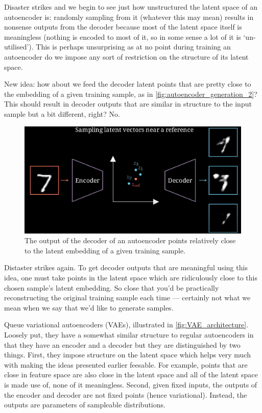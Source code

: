 \documentclass[11pt]{article}
\begin{document}
Disaster strikes and we begin to see just how unstructured the latent space of an autoencoder is: randomly sampling from it (whatever this may mean) results in nonsense outputs from the decoder because most of the latent space itself is meaningless (nothing is encoded to most of it, so in some sense a lot of it is `un-utilised'). This is perhaps unsurprising as at no point during training an autoencoder do we impose any sort of restriction on the structure of its latent space.

New idea: how about we feed the decoder latent points that are pretty close to the embedding of a given training sample, as in \autoref{fig:autoencoder_generation_2}? This should result in decoder outputs that are similar in structure to the input sample but a bit different, right? No.

\begin{figure}[ht]
    \centering
    \includegraphics[width=0.75\columnwidth]{./figures/generative_models/AEs_gen_2.png}
    \caption{\centering The output of the decoder of an autoencoder points relatively close to the latent embedding of a given training sample.}
    \label{fig:autoencoder_generation_2}
\end{figure}

Distaster strikes again. To get decoder outputs that are meaningful using this idea, one must take points in the latent space which are ridiculously close to this chosen sample's latent embedding. So close that you'd be practically reconstructing the original training sample each time — certainly not what we mean when we say that we'd like to generate samples.

Queue variational autoencoders (VAEs), illustrated in \autoref{fig:VAE_architecture}. Loosely put, they have a somewhat similar structure to regular autoencoders in that they have an encoder and a decoder but they are distinguished by two things. First, they impose structure on the latent space which helps very much with making the ideas presented earlier feesable. For example, points that are close in feature space are also close in the latent space and all of the latent space is made use of, none of it meaningless. Second, given fixed inputs, the outputs of the encoder and decoder are not fixed points (hence variational). Instead, the outputs are parameters of sampleable distributions.
\end{document}
